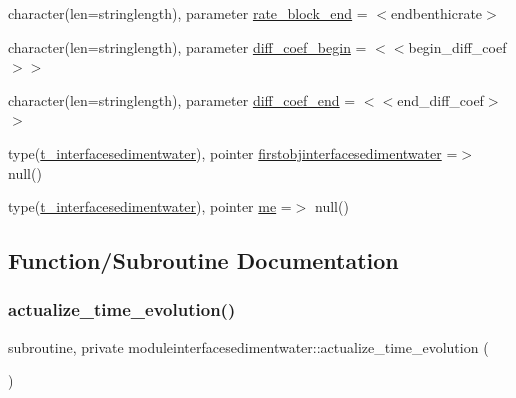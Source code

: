 \begin{DoxyCompactItemize}
\item 
character(len=stringlength), parameter \mbox{\hyperlink{namespacemoduleinterfacesedimentwater_aa259136976f9e453b7c25e5291fdb787}{rate\+\_\+block\+\_\+end}} = \textquotesingle{}$<$endbenthicrate$>$\textquotesingle{}
\item 
character(len=stringlength), parameter \mbox{\hyperlink{namespacemoduleinterfacesedimentwater_ac7261e1681e2edb95dca762fde562ef7}{diff\+\_\+coef\+\_\+begin}} = \textquotesingle{}$<$$<$begin\+\_\+diff\+\_\+coef$>$$>$\textquotesingle{}
\item 
character(len=stringlength), parameter \mbox{\hyperlink{namespacemoduleinterfacesedimentwater_aaa8c062f7adf40df72c79b2258fecf27}{diff\+\_\+coef\+\_\+end}} = \textquotesingle{}$<$$<$end\+\_\+diff\+\_\+coef$>$$>$\textquotesingle{}
\item 
type(\mbox{\hyperlink{structmoduleinterfacesedimentwater_1_1t__interfacesedimentwater}{t\+\_\+interfacesedimentwater}}), pointer \mbox{\hyperlink{namespacemoduleinterfacesedimentwater_aee59df166f2edf5e9a6bdf9c9e244666}{firstobjinterfacesedimentwater}} =$>$ null()
\item 
type(\mbox{\hyperlink{structmoduleinterfacesedimentwater_1_1t__interfacesedimentwater}{t\+\_\+interfacesedimentwater}}), pointer \mbox{\hyperlink{namespacemoduleinterfacesedimentwater_a7efbde1b20927018dae3a1223b393ee9}{me}} =$>$ null()
\end{DoxyCompactItemize}


\subsection{Function/\+Subroutine Documentation}
\mbox{\label{namespacemoduleinterfacesedimentwater_a82f97321667d905db79c85b574f47802}} 
\subsubsection{\texorpdfstring{actualize\+\_\+time\+\_\+evolution()}{actualize\_time\_evolution()}}
{\footnotesize\ttfamily subroutine, private moduleinterfacesedimentwater\+::actualize\+\_\+time\+\_\+evolution (\begin{DoxyParamCaption}{ }\end{DoxyParamCaption})\hspace{0.3cm}{\ttfamily [private]}}

